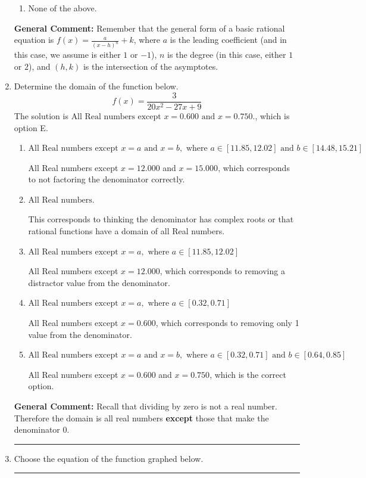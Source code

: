 \documentclass{extbook}[14pt]
\newcommand{\litem}[1]{\item #1

\rule{\textwidth}{0.4pt}}
\begin{document}
\begin{enumerate}
{\begin{enumerate}[label=\Alph*.]
\begin{multicols}{2}
\end{multicols}\item None of the above.\end{enumerate}
\textbf{General Comment:} Remember that the general form of a basic rational equation is $ f(x) = \frac{a}{(x-h)^n} + k$, where $a$ is the leading coefficient (and in this case, we assume is either $1$ or $-1$), $n$ is the degree (in this case, either $1$ or $2$), and $(h, k)$ is the intersection of the asymptotes.
}
\litem{
Determine the domain of the function below.
\[ f(x) = \frac{3}{20x^{2} -27 x + 9} \]
The solution is \( \text{All Real numbers except } x = 0.600 \text{ and } x = 0.750. \), which is option E.\begin{enumerate}[label=\Alph*.]
\item \( \text{All Real numbers except } x = a \text{ and } x = b, \text{ where } a \in [11.85, 12.02] \text{ and } b \in [14.48, 15.21] \)

All Real numbers except $x = 12.000$ and $x = 15.000$, which corresponds to not factoring the denominator correctly.
\item \( \text{All Real numbers.} \)

This corresponds to thinking the denominator has complex roots or that rational functions have a domain of all Real numbers.
\item \( \text{All Real numbers except } x = a, \text{ where } a \in [11.85, 12.02] \)

All Real numbers except $x = 12.000$, which corresponds to removing a distractor value from the denominator.
\item \( \text{All Real numbers except } x = a, \text{ where } a \in [0.32, 0.71] \)

All Real numbers except $x = 0.600$, which corresponds to removing only 1 value from the denominator.
\item \( \text{All Real numbers except } x = a \text{ and } x = b, \text{ where } a \in [0.32, 0.71] \text{ and } b \in [0.64, 0.85] \)

All Real numbers except $x = 0.600$ and $x = 0.750$, which is the correct option.
\end{enumerate}

\textbf{General Comment:} Recall that dividing by zero is not a real number. Therefore the domain is all real numbers \textbf{except} those that make the denominator 0.
}
\litem{
Choose the equation of the function graphed below.

}
\end{enumerate}
\end{document}
